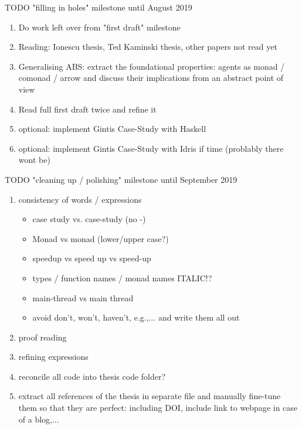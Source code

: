 \documentclass[oneside]{book}
\begin{document}
TODO "filling in holes" milestone until August 2019
\begin{enumerate}
	\item Do work left over from "first draft" milestone
	
	\item Reading: Ionescu thesis, Ted Kaminski thesis, other papers not read yet
	
	\item Generalising ABS: extract the foundational properties: agents as monad / comonad / arrow and discuss their implications from an abstract point of view

	\item Read full first draft twice and refine it
	
	\item optional: implement Gintis Case-Study with Haskell
	
	\item optional:  implement Gintis Case-Study with Idris if time (problably there wont be)
\end{enumerate}

TODO "cleaning up / polishing" milestone until September 2019
\begin{enumerate}
	\item consistency of words / expressions
		\begin{itemize}
			\item case study vs. case-study (no -)
			\item Monad vs monad (lower/upper case?)
			\item speedup vs speed up vs speed-up
			\item types / function names / monad names ITALIC!?
			\item main-thread vs main thread
			\item avoid don't, won't, haven't, e.g.,... and write them all out
		\end{itemize}
	\item proof reading

	\item refining expressions
	
	\item reconcile all code into thesis code folder?
	
	\item extract all references of the thesis in separate file and manually fine-tune them so that they are perfect: including DOI, include link to webpage in case of a blog,...
\end{enumerate}
\end{document}
